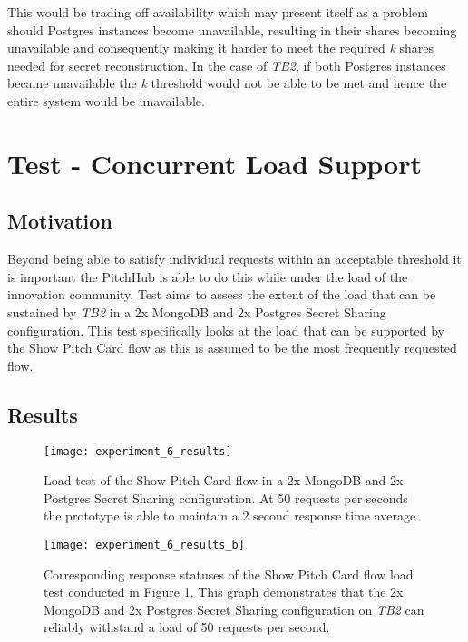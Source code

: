 This would be trading off availability which may present itself as a problem should Postgres instances become unavailable, resulting in their shares becoming unavailable and consequently making it harder to meet the required \textit{k} shares needed for secret reconstruction. In the case of \textit{TB2}, if both Postgres instances became unavailable the \textit{k} threshold would not be able to be met and hence the entire system would be unavailable.


\section{Test  - Concurrent Load Support}
\subsection{Motivation}
Beyond being able to satisfy individual requests within an acceptable threshold it is important the PitchHub is able to do this while under the load of the innovation community. Test  aims to assess the extent of the load that can be sustained by \textit{TB2} in a 2x MongoDB and 2x Postgres Secret Sharing configuration. This test specifically looks at the load that can be supported by the Show Pitch Card flow as this is assumed to be the most frequently requested flow.

\subsection{Results}

\begin{figure}[ht]
    \centering
    \texttt{[image: experiment\_6\_results]}
    \caption{Load test of the Show Pitch Card flow in a 2x MongoDB and 2x Postgres Secret Sharing configuration. At 50 requests per seconds the prototype is able to maintain a 2 second response time average. }
    \label{fig:test_6_results}
\end{figure}

\begin{figure}[ht]
    \centering
    \texttt{[image: experiment\_6\_results\_b]}
    \caption{Corresponding response statuses of the Show Pitch Card flow load test conducted in Figure \ref{fig:test_6_results}. This graph demonstrates that the 2x MongoDB and 2x Postgres Secret Sharing configuration on \textit{TB2} can reliably withstand a load of 50 requests per second.}
    \label{fig:test_6_results_b}
\end{figure}

